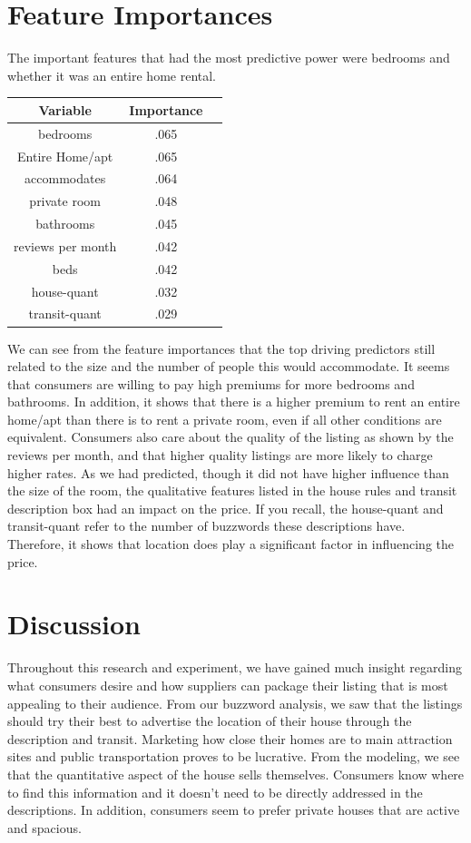 \documentclass[twocolumn,10pt]{asme2ej}
\begin{document}
\section{Feature Importances}
The important features that had the most predictive power were bedrooms and whether it was an entire home rental.
\begin{center}
\begin{tabular}{ |c|c|c| } 
\hline
  {\bf{Variable}} & {\bf{Importance}}  \\ 
 \hline
 bedrooms &   .065\\ 
 \hline
 Entire Home/apt &   .065\\ 
 \hline
accommodates & .064  \\ 
 \hline
 private room & .048  \\ 
 \hline
 bathrooms & .045  \\ 
 \hline
 reviews per month & .042  \\ 
 \hline
  beds & .042  \\ 
 \hline
 house-quant & .032  \\ 
 \hline
 transit-quant & .029  \\ 
 \hline
\end{tabular}
\end{center} 
We can see from the feature importances that the top driving predictors still related to the size and the number of people this would accommodate. It seems that consumers are willing to pay high premiums for more bedrooms and bathrooms. In addition, it shows that there is a higher premium to rent an entire home/apt than there is to rent a private room, even if all other conditions are equivalent. Consumers also care about the quality of the listing as shown by the reviews per month, and that higher quality listings are more likely to charge higher rates. As we had predicted, though it did not have higher influence than the size of the room, the qualitative features listed in the house rules and transit description box had an impact on the price. If you recall, the house-quant and transit-quant refer to the number of buzzwords these descriptions have. Therefore, it shows that location does play a significant factor in influencing the price.
\section{Discussion}
Throughout this research and experiment, we have gained much insight regarding what consumers desire and how suppliers can package their listing that is most appealing to their audience. From our buzzword analysis, we saw that the listings should try their best to advertise the location of their house through the description and transit. Marketing how close their homes are to main attraction sites and public transportation proves to be lucrative. From the modeling, we see that the quantitative aspect of the house sells themselves. Consumers know where to find this information and it doesn't need to be directly addressed in the descriptions. In addition, consumers seem to prefer private houses that are active and spacious. 
\end{document}
